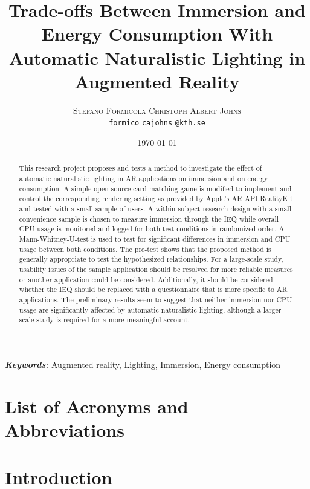 \documentclass[12pt,twoside,english]{article}
\title{Trade-offs Between Immersion and Energy Consumption With Automatic Naturalistic Lighting in Augmented Reality}
\author{
        \textsc{Stefano Formicola}
            \qquad
        \textsc{Christoph Albert Johns}
        \mbox{}\\
        \normalsize
            \texttt{formico}
        \textbar{}
            \texttt{cajohns}
        \normalsize
            \texttt{@kth.se}
}
\date{\today}
\providecommand{\keywords}[1]
{
  \small	
  \textbf{\textit{Keywords:}} #1
}
\begin{document}
\maketitle


\begin{abstract}
\label{sec:abstract}

This research project proposes and tests a method to investigate the effect of automatic naturalistic lighting in \gls{AR} applications on immersion and on energy consumption.
A simple open-source card-matching game is modified to implement and control the corresponding rendering setting as provided by Apple's \gls{AR} \gls{API} RealityKit and tested with a small sample of users.
A within-subject research design with a small convenience sample is chosen to measure immersion through the \gls{IEQ} while overall \gls{CPU} usage is monitored and logged for both test conditions in randomized order.
A Mann-Whitney-U-test is used to test for significant differences in immersion and \gls{CPU} usage between both conditions.
The pre-test shows that the proposed method is generally appropriate to test the hypothesized relationships.
For a large-scale study, usability issues of the sample application should be resolved for more reliable measures or another application could be considered.
Additionally, it should be considered whether the \gls{IEQ} should be replaced with a questionnaire that is more specific to \gls{AR} applications.
The preliminary results seem to suggest that neither immersion nor \gls{CPU} usage are significantly affected by automatic naturalistic lighting, although a larger scale study is required for a more meaningful account.

\end{abstract}

\keywords{Augmented reality, Lighting, Immersion, Energy consumption}
\clearpage

\tableofcontents

\section*{List of Acronyms and Abbreviations}
\label{list-of-acronyms-and-abbreviations}
\renewcommand{\glossarysection}[2][]{} %
\printglossary[type=\acronymtype, nonumberlist]

\clearpage
\section{Introduction}
\label{sect:introduction}
\end{document}
